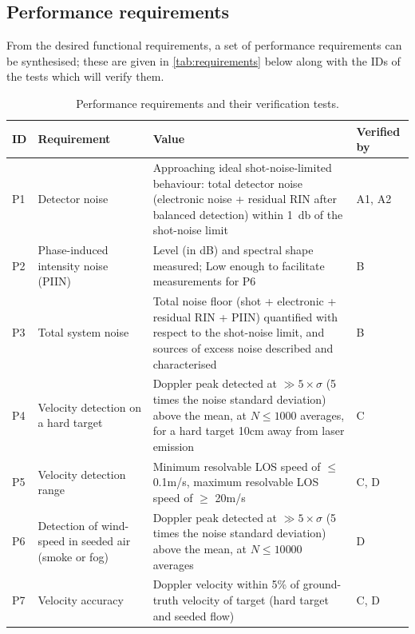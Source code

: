 \subsection{Performance requirements}
From the desired functional requirements, a set of performance requirements can be synthesised; these are given in \autoref{tab:requirements} below along with the IDs of the tests which will verify them. 

\begin{table}[H]
\centering
\small
\begin{tabular}{|p{0.5cm}|p{3cm}|p{9cm}|p{1.7cm}|}
\hline
\textbf{ID} & \textbf{Requirement} & \textbf{Value} & \textbf{Verified by} \\ \hline
P1 & Detector noise & Approaching ideal shot-noise-limited behaviour: total
     detector noise (electronic noise + residual RIN after balanced
     detection) within \SI{1}{\decibel} of the shot-noise limit
    & A1, A2 \\ \hline
 P2 & Phase-induced intensity noise (PIIN) & Level (in dB) and spectral shape measured; Low enough to facilitate measurements for P6 & B \\ \hline
P3 & Total system noise & Total noise floor (shot + electronic + residual RIN + PIIN) quantified with respect to the shot-noise limit, and sources of excess noise described and characterised & B \\ \hline
 P4 & Velocity detection on a hard target & Doppler peak detected at $ \gg 5\times\sigma$ (5 times the noise standard deviation) above the  mean, at $N \leq 1000$ averages, for a hard target 10cm away from laser emission & C \\ \hline
P5 & Velocity detection range & Minimum resolvable LOS speed of $\leq$ 0.1m/s, maximum resolvable LOS speed of $\geq$ 20m/s & C, D \\ \hline
P6 & Detection of wind-speed in seeded air (smoke or fog) & Doppler peak detected at $ \gg 5\times\sigma$ (5 times the noise standard deviation) above the  mean, at $N \leq 10 000$ averages 
& D \\ \hline
P7 & Velocity accuracy & Doppler velocity within 5\% of ground-truth velocity of target (hard target and seeded flow) & C, D \\
\hline
\end{tabular}
\caption{Performance requirements and their verification tests.}
\label{tab:requirements}
\end{table}

